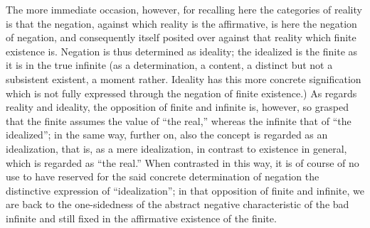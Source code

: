 The more immediate occasion, however,
for recalling here the categories of reality
is that the negation, against which reality is the affirmative,
is here the negation of negation,
and consequently itself posited over against
that reality which finite existence is.
Negation is thus determined as ideality;
the idealized is the finite as it is in the true infinite
(as a determination, a content, a distinct but
not a subsistent existent, a moment rather.
Ideality has this more concrete signification
which is not fully expressed through
the negation of finite existence.)
As regards reality and ideality,
the opposition of finite and infinite is, however,
so grasped that the finite assumes the value of “the real,”
whereas the infinite that of “the idealized”;
in the same way, further on, also the concept is
regarded as an idealization, that is, as a mere idealization,
in contrast to existence in general, which is regarded as “the real.”
When contrasted in this way, it is of course of no use to have
reserved for the said concrete determination of negation
the distinctive expression of “idealization”;
in that opposition of finite and infinite,
we are back to the one-sidedness of
the abstract negative characteristic of the bad infinite
and still fixed in the affirmative existence of the finite.

